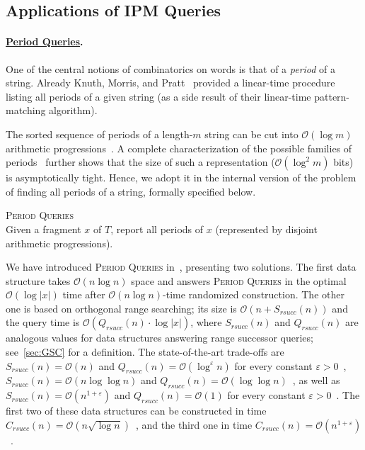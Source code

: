 \documentclass[a4paper]{article}
\theoremstyle{definition}
\theoremstyle{remark}
\newcommand{\PQ}{\textsc{Period Queries}\xspace}
\newcommand{\eps}{\varepsilon}
\newcommand{\Oh}{\mathcal{O}}
\newcommand{\rsucc}{\mathit{rsucc}}
\newenvironment{dsproblem}[1]
{\begin{center}\begin{lrbox}{\mybox}\begin{minipage}{0.96\columnwidth}{\textsc{#1}}\\}
{\end{minipage}\end{lrbox}\fbox{\usebox{\mybox}}\end{center}}
\newcommand{\defdsproblem}[2]{
  \begin{dsproblem}{#1}
#2
  \end{dsproblem}
  }
\begin{document}
\subsection{Applications of IPM Queries}\label{subsec:app}
\paragraph{\underline{Period Queries}.}
One of the central notions of combinatorics on words is that of a \emph{period} of a string.
Already Knuth, Morris, and Pratt~\cite{morris1970linear,DBLP:journals/siamcomp/KnuthMP77}
provided a linear-time procedure listing all periods of a given string (as a side result of their linear-time pattern-matching algorithm).

The sorted sequence of periods of a length-$m$ string can be cut into $\Oh(\log m)$ arithmetic progressions~\cite{DBLP:journals/siamcomp/KnuthMP77}.
A complete characterization of the possible families of periods~\cite{DBLP:journals/jct/GuibasO81} further shows
that the size of such a representation ($\Oh(\log^2 m)$ bits) is asymptotically tight.
Hence, we adopt it in the internal version of the problem of finding all periods of a string,
formally specified below.

\defdsproblem{\PQ}{Given a fragment $x$ of $T$, report all periods of $x$ (represented by disjoint arithmetic progressions).}

We have introduced \PQ in~\cite{DBLP:conf/spire/KociumakaRRW12},
presenting two solutions. 
The first data structure takes $\Oh(n\log n)$ space and answers \PQ in the optimal $\Oh(\log |x|)$ time
after $\Oh(n\log n)$-time randomized construction.
The other one is based on orthogonal range searching;
its size is $\Oh(n+S_\rsucc(n))$ and the query time is $\Oh(Q_\rsucc(n)\cdot \log |x|)$,
where $S_{\rsucc}(n)$ and $Q_{\rsucc}(n)$
are analogous values for data structures answering range successor queries; see~\cref{sec:GSC} for a definition.
The state-of-the-art trade-offs are $S_{\rsucc}(n)=\Oh(n)$ and $Q_{\rsucc}(n)=\Oh(\log^{\eps} n)$ for every constant $\eps>0$~\cite{DBLP:conf/swat/NekrichN12},
$S_{\rsucc}(n)=\Oh(n \log \log n)$ and $Q_{\rsucc}(n)=\Oh(\log \log n)$~\cite{DBLP:journals/ipl/Zhou16},
as well as $S_{\rsucc}(n)=\Oh(n^{1+\eps})$ and $Q_{\rsucc}(n)=\Oh(1)$ for every constant $\eps>0$~\cite{DBLP:journals/tcs/CrochemoreIKRTW12}.
The first two of these data structures can be constructed in time $C_{\rsucc}(n)=\Oh(n\sqrt{\log n})$~\cite{DBLP:conf/soda/BelazzouguiP16,Gao2020},
and the third one in time $C_{\rsucc}(n)=\Oh(n^{1+\eps})$~\cite{DBLP:journals/tcs/CrochemoreIKRTW12}.
\end{document}
